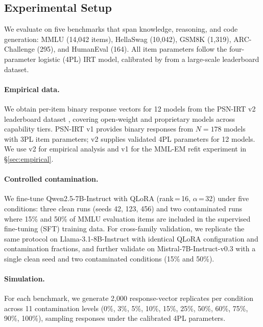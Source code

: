 \subsection{Experimental Setup}
\label{sec:setup}

We evaluate on five benchmarks that span knowledge, reasoning, and code generation: MMLU \citep{hendrycks2021mmlu} (14,042 items), HellaSwag \citep{zellers2019hellaswag} (10,042), GSM8K \citep{cobbe2021gsm8k} (1,319), ARC-Challenge \citep{clark2018arc} (295), and HumanEval \citep{chen2021humaneval} (164).
All item parameters follow the four-parameter logistic (4PL) IRT model, calibrated by \citet{psnirt2026} from a large-scale leaderboard dataset.

\paragraph{Empirical data.}
We obtain per-item binary response vectors for 12 models from the PSN-IRT v2 leaderboard dataset \citep{psnirt2026}, covering open-weight and proprietary models across capability tiers.
PSN-IRT v1 provides binary responses from $N{=}178$ models with 3PL item parameters; v2 supplies validated 4PL parameters for 12 models.
We use v2 for empirical analysis and v1 for the MML-EM refit experiment in \S\ref{sec:empirical}.

\paragraph{Controlled contamination.}
We fine-tune Qwen2.5-7B-Instruct with QLoRA (rank\,=\,16, $\alpha$\,=\,32) under five conditions: three clean runs (seeds 42, 123, 456) and two contaminated runs where 15\% and 50\% of MMLU evaluation items are included in the supervised fine-tuning (SFT) training data.
For cross-family validation, we replicate the same protocol on Llama-3.1-8B-Instruct with identical QLoRA configuration and contamination fractions, and further validate on Mistral-7B-Instruct-v0.3 with a single clean seed and two contaminated conditions (15\% and 50\%).

\paragraph{Simulation.}
For each benchmark, we generate 2{,}000 response-vector replicates per condition across 11 contamination levels (0\%, 3\%, 5\%, 10\%, 15\%, 25\%, 50\%, 60\%, 75\%, 90\%, 100\%), sampling responses under the calibrated 4PL parameters.

